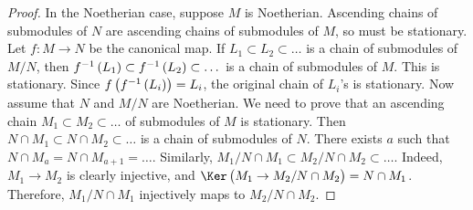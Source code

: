\begin{proof}
In the Noetherian case, suppose $ M $ is Noetherian. Ascending chains of submodules of $ N $ are ascending chains of submodules of $ M $, so must be stationary. Let $ f : M \to N $ be the canonical map. If $ L_1 \subset L_2 \subset \dots $ is a chain of submodules of $ M / N $, then $ f^{-1}\br{L_1} \subset f^{-1}\br{L_2} \subset \dots $ is a chain of submodules of $ M $. This is stationary. Since $ f\br{f^{-1}\br{L_i}} = L_i $, the original chain of $ L_i $'s is stationary. Now assume that $ N $ and $ M / N $ are Noetherian. We need to prove that an ascending chain $ M_1 \subset M_2 \subset \dots $ of submodules of $ M $ is stationary. Then $ N \cap M_1 \subset N \cap M_2 \subset \dots $ is a chain of submodules of $ N $. There exists $ a $ such that $ N \cap M_a = N \cap M_{a + 1} = \dots $. Similarly, $ M_1 / N \cap M_1 \subset M_2 / N \cap M_2 \subset \dots $. Indeed, $ M_1 \to M_2 $ is clearly injective, and $ \Ker \br{M_1 \to M_2 / N \cap M_2} = N \cap M_1 $. Therefore, $ M_1 / N \cap M_1 $ injectively maps to $ M_2 / N \cap M_2 $.
\end{proof}

